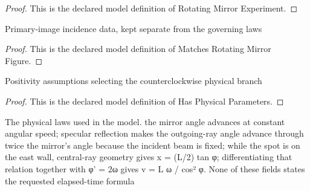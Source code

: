 \begin{proof}
  This is the declared model definition of Rotating Mirror Experiment.
\end{proof}
\begin{definition}
  \label{def:physics:phyx-mini-0025:phyxminiproblems-problemphyxmini0025-matchesrotatingmirrorfigure}
  Primary-image incidence data, kept separate from the governing laws
\end{definition}
\begin{proof}
  This is the declared model definition of Matches Rotating Mirror Figure.
\end{proof}
\begin{definition}
  \label{def:physics:phyx-mini-0025:phyxminiproblems-problemphyxmini0025-hasphysicalparameters}
  Positivity assumptions selecting the counterclockwise physical branch
\end{definition}
\begin{proof}
  This is the declared model definition of Has Physical Parameters.
\end{proof}
\begin{definition}
  \label{def:physics:phyx-mini-0025:phyxminiproblems-problemphyxmini0025-rotatingmirroropticslaws}
  The physical laws used in the model. the mirror angle advances at constant angular speed; specular reflection makes the outgoing-ray angle advance through twice the mirror's angle because the incident beam is fixed; while the spot is on the east wall, central-ray geometry gives x = (L/2) tan φ; differentiating that relation together with φ' = 2ω gives v = L ω / cos² φ. None of these fields states the requested elapsed-time formula
\end{definition}
